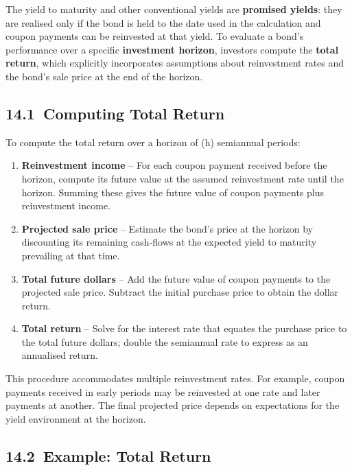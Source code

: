 \documentclass[
  letterpaper,
  DIV=11,
  numbers=noendperiod]{scrartcl}
\providecommand{\tightlist}{%
  \setlength{\itemsep}{0pt}\setlength{\parskip}{0pt}}
\begin{document}
The yield to maturity and other conventional yields are \textbf{promised
yields}: they are realised only if the bond is held to the date used in
the calculation and coupon payments can be reinvested at that yield. To
evaluate a bond's performance over a specific \textbf{investment
horizon}, investors compute the \textbf{total return}, which explicitly
incorporates assumptions about reinvestment rates and the bond's sale
price at the end of the horizon.

\subsection{14.1~Computing Total Return}\label{computing-total-return}

To compute the total return over a horizon of (h) semiannual periods:

\begin{enumerate}
\def\labelenumi{\arabic{enumi}.}
\tightlist
\item
  \textbf{Reinvestment income} -- For each coupon payment received
  before the horizon, compute its future value at the assumed
  reinvestment rate until the horizon. Summing these gives the future
  value of coupon payments plus reinvestment income.
\item
  \textbf{Projected sale price} -- Estimate the bond's price at the
  horizon by discounting its remaining cash‑flows at the expected yield
  to maturity prevailing at that time.
\item
  \textbf{Total future dollars} -- Add the future value of coupon
  payments to the projected sale price. Subtract the initial purchase
  price to obtain the dollar return.
\item
  \textbf{Total return} -- Solve for the interest rate that equates the
  purchase price to the total future dollars; double the semiannual rate
  to express as an annualised return.
\end{enumerate}

This procedure accommodates multiple reinvestment rates. For example,
coupon payments received in early periods may be reinvested at one rate
and later payments at another. The final projected price depends on
expectations for the yield environment at the horizon.

\subsection{14.2~Example: Total Return}\label{example-total-return}
\end{document}
